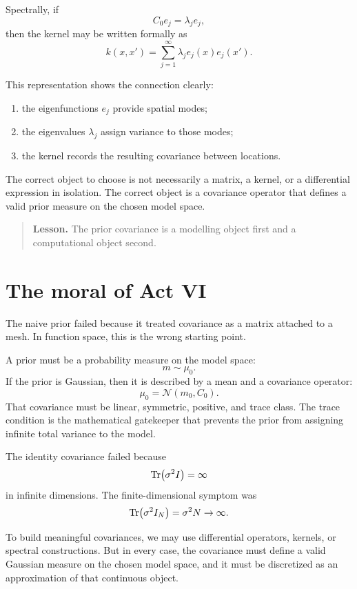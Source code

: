 \documentclass[11pt,a4paper]{book}
\newenvironment{lesson}
  {\begin{quote}\textbf{Lesson.}}
  {\end{quote}}
\newcommand{\prior}{\mu_0}
\begin{document}
Spectrally, if
\[
    C_0 e_j=\lambda_j e_j,
\]
then the kernel may be written formally as
\[
    k(x,x')
    =
    \sum_{j=1}^{\infty}
    \lambda_j e_j(x)e_j(x').
\]

This representation shows the connection clearly:
\begin{enumerate}[label=\arabic*.]
    \item the eigenfunctions $e_j$ provide spatial modes;
    \item the eigenvalues $\lambda_j$ assign variance to those modes;
    \item the kernel records the resulting covariance between locations.
\end{enumerate}

The correct object to choose is not necessarily a matrix, a kernel, or a
differential expression in isolation. The correct object is a covariance
operator that defines a valid prior measure on the chosen model space.

\begin{lesson}
The prior covariance is a modelling object first and a computational object
second.
\end{lesson}

\section{The moral of Act VI}

The naive prior failed because it treated covariance as a matrix attached to a
mesh. In function space, this is the wrong starting point.

A prior must be a probability measure on the model space:
\[
    m\sim\prior.
\]
If the prior is Gaussian, then it is described by a mean and a covariance
operator:
\[
    \prior=\mathcal{N}(m_0,C_0).
\]
That covariance must be linear, symmetric, positive, and trace class. The trace
condition is the mathematical gatekeeper that prevents the prior from assigning
infinite total variance to the model.

The identity covariance failed because
\[
    \Tr(\sigma^2 I)=\infty
\]
in infinite dimensions. The finite-dimensional symptom was
\[
    \Tr(\sigma^2 I_N)=\sigma^2 N\to\infty.
\]

To build meaningful covariances, we may use differential operators, kernels, or
spectral constructions. But in every case, the covariance must define a valid
Gaussian measure on the chosen model space, and it must be discretized as an
approximation of that continuous object.
\end{document}
